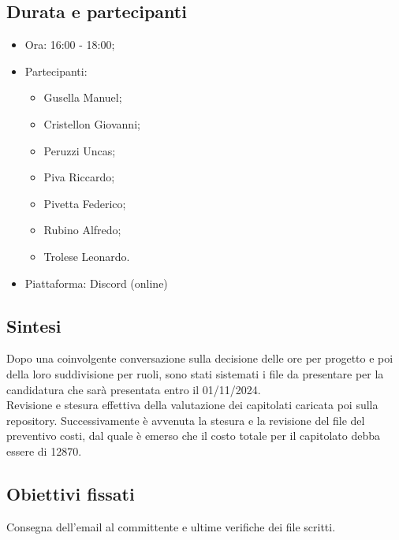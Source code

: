 \documentclass[12pt]{article}
\begin{document}
\subsection{Durata e partecipanti}
\begin{itemize}
\item Ora: 16:00 - 18:00;
\item Partecipanti: 	
	\begin{itemize}
	\item Gusella Manuel;
	\item Cristellon Giovanni;
	\item Peruzzi Uncas;
	\item Piva Riccardo;
	\item Pivetta Federico;
	\item Rubino Alfredo;
	\item Trolese Leonardo.
	\end{itemize}
\item Piattaforma: Discord (online)
\end{itemize}
\subsection{Sintesi}
Dopo una coinvolgente conversazione sulla decisione delle ore per progetto e poi della loro suddivisione per ruoli, sono stati sistemati i file da presentare per la candidatura che sarà presentata entro il 01/11/2024.\\
Revisione e stesura effettiva della valutazione dei capitolati caricata poi sulla repository. Successivamente è avvenuta la stesura e la revisione del file del preventivo costi, dal quale è emerso che il costo totale per il capitolato debba essere di 12870\texteuro. \\
\subsection{Obiettivi fissati}
Consegna dell'email al committente e ultime verifiche dei file scritti.
\end{document}
